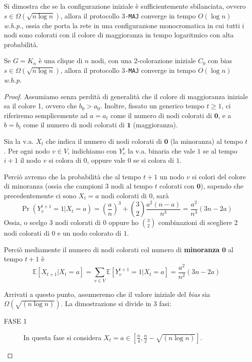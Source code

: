 Si dimostra che se la configurazione iniziale è sufficientemente sbilanciata, ovvero $s \in \Omega(\sqrt{n \log n})$, allora il protocollo 3\texttt{-MAJ} converge in tempo $O(\log n)$ \textit{w.h.p.}, ossia che porta la rete in una configurazione monocromatica in cui tutti i nodi sono colorati con il colore di maggioranza in tempo logaritmico con alta probabilità.

\begin{teorema}
    Se $G = K_n$ è una clique di $n$ nodi, con una 2-colorazione iniziale $C_0$ con bias $s \in \Omega(\sqrt{n \log n})$, allora il protocollo 3\texttt{-MAJ} converge in tempo $O(\log n)$ \textit{w.h.p.}
    \begin{proof}

        Assumiamo senza perdità di generalità che il colore di maggioranza iniziale sa il colore 1, ovvero che $b_0 > a_0$. Inoltre, fissato un generico tempo $t \geq 1$, ci riferiremo semplicemente ad $a = a_t$ come il numero di nodi colorati di $\mathbf{0}$, e a $b = b_t$ come il numero di nodi colorati di $\mathbf{1}$ (maggioranza).

        Sia la v.a. $X_t$ che indica il numero di nodi colorati di $\mathbf{0}$ (la minoranza) al tempo $t$. Per ogni nodo $v \in V$, indichiamo con $Y_v^i$ la v.a. binaria che vale $1$ se al tempo $i + 1$ il nodo $v$ si colora di $0$, oppure vale $0$ se si colora di $1$.

        Perciò avremo che la probabilità che al tempo $t + 1$ un nodo $v$ si colori del colore di minoranza (ossia che campioni 3 nodi al  tempo $t$ colorati con $\mathbf{0}$), sapendo che precedentemente ci sono $X_t = a$ nodi colorati di $0$, sarà
        \[
            \Pr(Y_v^{t+1} = 1 | X_t = a) = \left( \frac{a}{n} \right)^3 + \binom{3}{2} \frac{a^2(n - a)}{n^3} = \frac{a^2}{n^3}(3n - 2a)
        \]
        Ossia, o scelgo 3 nodi colorati di $0$ oppure ho $\binom{3}{2}$ combinazioni di scegliere 2 nodi colorati di $0$ e un nodo colorato di $1$.

        Perciò mediamente il numero di nodi colorati col numero di \textbf{minoranza} $\mathbf{0}$ al tempo $t + 1$ è
        \[
            \mathbb{E}[X_{t+1} | X_t = a] = \sum_{v \in V} \mathbb{E}[Y_v^{t+1} = 1 | X_t = a] = \frac{a^2}{n^2}(3n - 2a)
        \]

        Arrivati a questo punto, assumeremo che il valore iniziale del \textit{bias} sia $\Omega(\sqrt{(n \log n)})$. La dimostrazione si divide in 3 fasi:

        \begin{description}
            \item[FASE 1] In questa fase si considera $X_t = a \in [\frac{n}{4}, \frac{n}{2} - \sqrt{(n \log n)}]$.
            

\end{description}
\end{proof}
\end{teorema}
